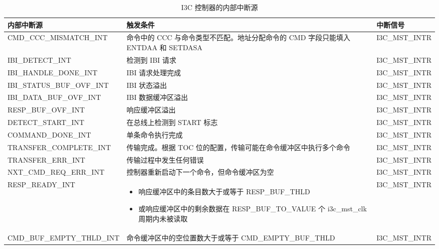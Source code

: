 \documentclass[main\_\_CN.tex]{subfiles}
\begin{document}
\begin{longtable}{ | L{4.5cm} | L{8.5cm} | L{2.5cm} | }
\caption{I3C 控制器的内部中断源} \label{tab:i3c_controller-int-sources}
\\ \hline
{}
\textbf{内部中断源} & \textbf{触发条件}  &  \textbf{中断信号}\\ \hline
\label{int:CMDCCCMISMATCHINT}CMD\_CCC\_MISMATCH\_INT  &  命令中的 CCC 与命令类型不匹配。地址分配命令的 CMD 字段只能填入 ENTDAA 和 SETDASA &  I3C\_MST\_INTR  \\ \hline
\label{int:IBIDETECTINT}IBI\_DETECT\_INT &  检测到 IBI 请求 & I3C\_MST\_INTR \\ \hline
\label{int:IBIHANDLEDONEINT}IBI\_HANDLE\_DONE\_INT &  IBI 请求处理完成  & I3C\_MST\_INTR \\ \hline
\label{int:IBISTATUSBUFOVFINT}IBI\_STATUS\_BUF\_OVF\_INT &  IBI 状态溢出  & I3C\_MST\_INTR \\ \hline
\label{int:IBIDATABUFOVFINT}IBI\_DATA\_BUF\_OVF\_INT &  IBI 数据缓冲区溢出  & I3C\_MST\_INTR \\ \hline
\label{int:RESPBUFOVFINT}RESP\_BUF\_OVF\_INT &  响应缓冲区溢出 & I3C\_MST\_INTR \\ \hline
\label{int:DETECTSTARTINT}DETECT\_START\_INT &  在总线上检测到 START 标志  & I3C\_MST\_INTR \\ \hline
\label{int:COMMANDDONEINT}COMMAND\_DONE\_INT &  单条命令执行完成  & I3C\_MST\_INTR \\ \hline
\label{int:TRANSFERCOMPLETEINT}TRANSFER\_COMPLETE\_INT &  传输完成。根据 TOC 位的配置，传输可能在命令缓冲区中执行多个命令  & I3C\_MST\_INTR \\ \hline
\label{int:TRANSFERERRINT}TRANSFER\_ERR\_INT &  传输过程中发生任何错误  & I3C\_MST\_INTR \\ \hline
\label{int:NXTCMDREQERRINT}NXT\_CMD\_REQ\_ERR\_INT &  控制器重新启动下一个命令，但命令缓冲区为空 & I3C\_MST\_INTR \\ \hline
\label{int:RESPREADYINT}RESP\_READY\_INT & \begin{itemize}
    \item 响应缓冲区中的条目数大于或等于 RESP\_BUF\_THLD
    \item 或响应缓冲区中的剩余数据在 RESP\_BUF\_TO\_VALUE 个 i3c\_mst\_clk 周期内未被读取
\end{itemize}   & I3C\_MST\_INTR \\ \hline
\label{int:CMDBUFEMPTYTHLDINT}CMD\_BUF\_EMPTY\_THLD\_INT &  命令缓冲区中的空位置数大于或等于 CMD\_EMPTY\_BUF\_THLD  & I3C\_MST\_INTR \\ \hline

\end{longtable}
\end{document}
